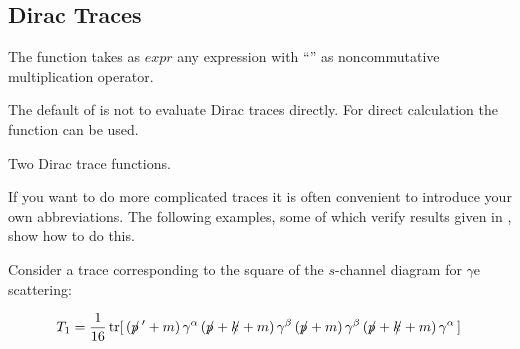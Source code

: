 \subsection{Dirac Traces}
\label{traces}

The function  takes as $expr$ any expression with ``'' as
noncommutative multiplication operator.

The default of  is not to evaluate Dirac traces directly.
For direct calculation the function  can be used.

 {Two Dirac trace functions.}

\beom
{}
\enom

If you want to do more complicated traces it is often convenient to introduce your own abbreviations. The following examples, some of which verify results given in \cite{Wo79}, show how to do this. 

Consider a trace corresponding to the square of the $s$-channel diagram for $\gamma$e scattering:

 \[ T_1 = \frac{1}{16}\,{\rm tr}[\, (\bps\,' + m)\,\gamma^{\alpha}\, 
      (\bps + \ks + m)\, \gamma^{\beta}\, (\bps + m)\,
       \gamma^{\beta}\,(\bps + \ks + m)\, 
        \gamma^{\alpha}\,]\,
  \]

